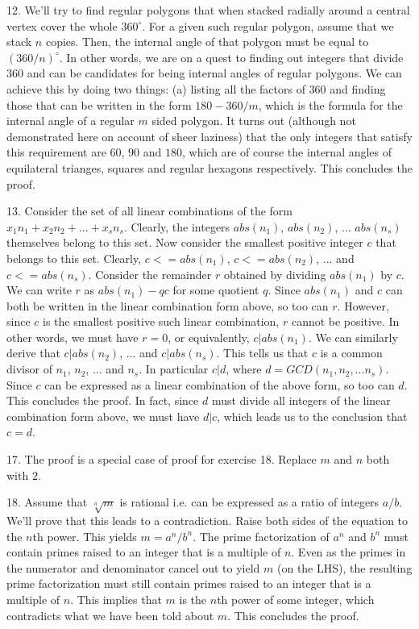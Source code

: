 \documentclass{article}
\begin{document}
12. We'll try to find regular polygons that when stacked radially around a central vertex cover the whole $360^\circ$. For a given such regular polygon, assume that we stack $n$ copies. Then, the internal angle of that polygon must be equal to $(360/n)^\circ$. In other words, we are on a quest to finding out integers that divide $360$ and can be candidates for being internal angles of regular polygons. We can achieve this by doing two things: (a) listing all the factors of $360$ and finding those that can be written in the form $180 - 360/m$, which is the formula for the internal angle of a regular $m$ sided polygon. It turns out (although not demonstrated here on account of sheer laziness) that the only integers that satisfy this requirement are $60$, $90$ and $180$, which are of course the internal angles of equilateral trianges, squares and regular hexagons respectively. This concludes the proof.

13. Consider the set of all linear combinations of the form $x_1n_1 + x_2n_2 + ... + x_sn_s$. Clearly, the integers $abs(n_1)$, $abs(n_2)$, ... $abs(n_s)$ themselves belong to this set. Now consider the smallest positive integer $c$ that belongs to this set. Clearly, $c <= abs(n_1)$, $c <= abs(n_2)$, ... and $c <= abs(n_s)$. Consider the remainder $r$ obtained by dividing $abs(n_1)$ by $c$. We can write $r$ as $abs(n_1) - qc$ for some quotient $q$. Since $abs(n_1)$ and $c$ can both be written in the linear combination form above, so too can $r$. However, since $c$ is the smallest positive such linear combination, $r$ cannot be positive. In other words, we must have $r = 0$, or equivalently, $c | abs(n_1)$. We can similarly derive that $c | abs(n_2)$, ... and $c | abs(n_s)$. This tells us that $c$ is a common divisor of $n_1$, $n_2$, ... and $n_s$. In particular $c | d$, where $d = GCD(n_1, n_2, ...n_s)$. Since $c$ can be expressed as a linear combination of the above form, so too can $d$. This concludes the proof. In fact, since $d$ must divide all integers of the linear combination form above, we must have $d | c$, which leads us to the conclusion that $c = d$.

17. The proof is a special case of proof for exercise 18. Replace $m$ and $n$ both with $2$.

18. Assume that $\sqrt[n]{m}$ is rational i.e. can be expressed as a ratio of integers $a / b$. We'll prove that this leads to a contradiction. Raise both sides of the equation to the $n$th power. This yields $m = a^n / b^n$. The prime factorization of $a^n$ and $b^n$ must contain primes raised to an integer that is a multiple of $n$. Even as the primes in the numerator and denominator cancel out to yield $m$ (on the LHS), the resulting prime factorization must still contain primes raised to an integer that is a multiple of $n$. This implies that $m$ is the $n$th power of some integer, which contradicts what we have been told about $m$. This concludes the proof.
\end{document}
